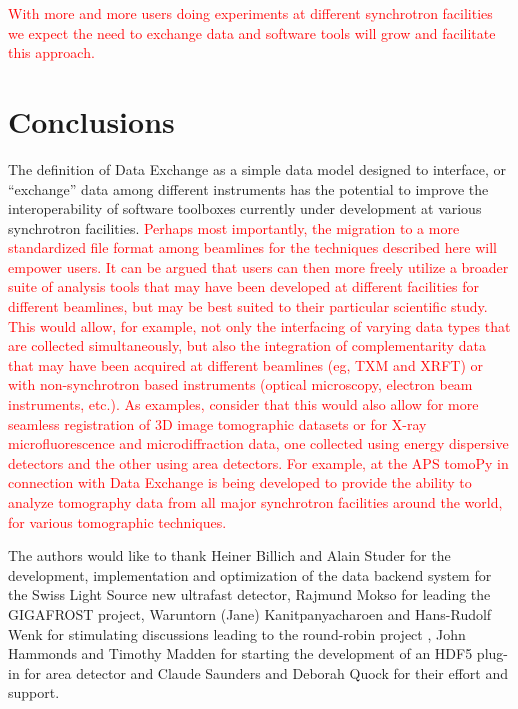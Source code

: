 \documentclass[pdf]{iucr}              %
\begin{document}
\textcolor{red}{With more and more users doing experiments at different synchrotron facilities we expect the need to exchange data and software tools will grow and facilitate this approach.}
 

\section{Conclusions}

The definition of Data Exchange as a simple data model designed to interface, or ``exchange'' data among different instruments has the potential to improve the interoperability of software toolboxes currently under development at various synchrotron facilities. \textcolor{red}{Perhaps most importantly, the migration to a more standardized file format among beamlines for the techniques described here will empower users. It can be argued that users can then more freely utilize a broader suite of analysis tools that may have been developed at different facilities for different beamlines, but may be best suited to their particular scientific study. This would allow, for example, not only the interfacing of varying data types that are collected simultaneously, but also the integration of complementarity data that may have been acquired at different beamlines (eg, TXM and XRFT) or with non-synchrotron based instruments (optical microscopy, electron beam instruments, etc.). As examples, consider that this would also allow for more seamless registration of 3D image tomographic datasets or for X-ray microfluorescence and microdiffraction data, one collected using energy dispersive detectors and the other using area detectors. For example, at the APS tomoPy \cite{python_cpp} in connection with Data Exchange is being developed to provide the ability to analyze tomography data from all major synchrotron facilities around the world, for various  \textcolor{red}{tomographic } techniques.} 







The authors would like to thank Heiner Billich and Alain Studer for the development, implementation and optimization of the data backend system for the Swiss Light Source new ultrafast detector, Rajmund Mokso for leading the GIGAFROST project, Waruntorn (Jane) Kanitpanyacharoen and Hans-Rudolf Wenk for stimulating discussions leading to the round-robin project \cite{Kanitpanyacharoen}, John Hammonds and Timothy Madden for starting the development of an HDF5 plug-in for area detector  and Claude Saunders and Deborah Quock for their effort and support.
\end{document}
